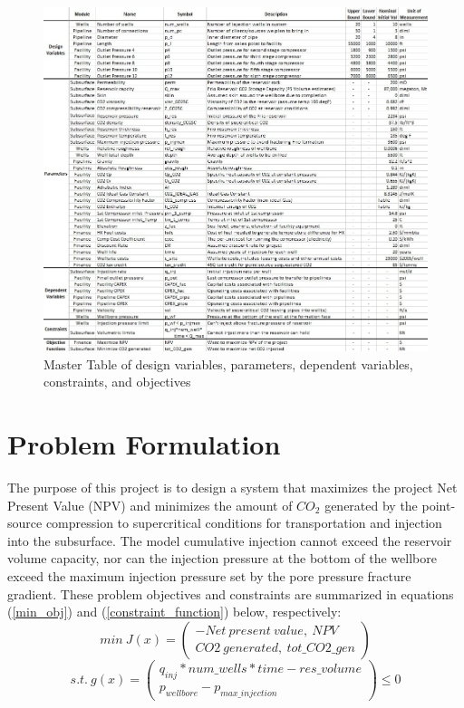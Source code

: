\documentclass[balance,upint,subscriptcorrection,varvw,mathalfa=cal=boondoxo,spanish,french,vietnamese,russian,greek,pdf-a,colorlinks]{asmeconf}
\begin{document}
\begin{figure}[btp]
\centering\includegraphics[width=0.95\linewidth]{images/Master_Table_v4.jpg}
\caption{Master Table of design variables, parameters, dependent variables, constraints, and objectives }\label{master_table:1}
\end{figure}

\section{Problem Formulation}
The purpose of this project is to design a system that maximizes the project Net Present Value (NPV) and minimizes the amount of $CO_{2}$ generated by the point-source compression to supercritical conditions for transportation and injection into the subsurface. The model cumulative injection cannot exceed the reservoir volume capacity, nor can the injection pressure at the bottom of the wellbore exceed the maximum injection pressure set by the pore pressure fracture gradient. These problem objectives and constraints are summarized in equations (\ref{min_obj}) and (\ref{constraint_function}) below, respectively:
\begin{equation} \label{min_obj}
  min\ J(x) = 
  \begin{pmatrix}
      -Net\ present\ value,\ NPV \\
      CO2\ generated,\ tot\_CO2\_gen
  \end{pmatrix}
\end{equation}
\begin{equation} \label{constraint_function}
  s.t.\ g(x) = 
  \begin{pmatrix}
      q_{inj} * num\_wells * time-res\_volume \\
      p_{wellbore} - p_{max\_injection}
  \end{pmatrix}
  \leq 0
\end{equation}
\end{document}
